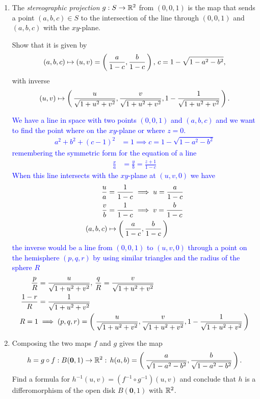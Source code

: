 \documentclass[10pt,a4paper]{report}
\newcommand{\BLUE}[1]{\textcolor{blue}{#1}}
\begin{document}
\begin{enumerate}[label=(\alph*)]
	\item The \textit{stereographic projection} $g: S \to \mathbb{R}^2$ from $(0,0,1)$ is the map that sends a point $(a,b,c) \in S$ to the intersection of the line through $(0,0,1)$ and $(a,b,c)$ with the $xy$-plane.
	
	Show that it is given by 
	\begin{align*}
		(a,b,c)\mapsto (u,v)=\left (\, \frac{a}{1-c},\frac{b}{1-c} \,\right ), \, c=1-\sqrt{1-a^2-b^2},
	\end{align*}with inverse
	\begin{align*}
		(u,v) \mapsto\left (\, \frac{u}{\sqrt{1+u^2+v^2}}, \frac{v}{\sqrt{1+u^2+v^2}}, 1-\frac{1}{\sqrt{1+u^2+v^2}} \,\right ).
	\end{align*}
	
	\BLUE{We have a line in space with two points $(0,0,1)$ and $(a,b,c)$ and we want to find the point where on the $xy$-plane or where $z=0$.  
	\begin{align*}
		a^2+b^2+(c-1)^2 &= 1 \implies c = 1-\sqrt{1-a^2-b^2}
	\end{align*}remembering the symmetric form for the equation of a line
	\begin{align*}
		\frac{x}{a} &= \frac{y}{b} = \frac{z+1}{1-c}
	\end{align*}When this line intersects with the $xy$-plane at $(u,v,0)$ we have
	\begin{align*}
		\frac{u}{a} &= \frac{1}{1-c} \implies u = \frac{a}{1-c} \\
		\frac{v}{b}  &= \frac{1}{1-c} \implies v = \frac{b}{1-c} \\
		(a,b,c) &\mapsto\left (\, \frac{a}{1-c}, \frac{b}{1-c} \,\right )
	\end{align*}the inverse would be a line from $(0,0,1)$ to $(u,v,0)$ through a point on the hemisphere $(p,q,r)$ by using similar triangles and the radius of the sphere $R$
	\begin{align*}
		\frac{p}{R} &= \frac{u}{\sqrt{1+u^2+v^2}}, \, \frac{q}{R} = \frac{v}{\sqrt{1+u^2+v^2}} \\
		\frac{1-r}{R} &= \frac{1}{\sqrt{1+u^2+v^2}} \\
		R = 1 &\implies (p,q,r) = \left (\, \frac{u}{\sqrt{1+u^2+v^2}}, \frac{v}{\sqrt{1+u^2+v^2}}, 1-\frac{1}{\sqrt{1+u^2+v^2}} \,\right )
	\end{align*}
	}
	
	\item Composing the two maps $f$ and $g$ gives the map
	\begin{align*}
		h=g \circ f: B(\textbf{0}, 1) \to \mathbb{R}^2: \, h(a,b) = \left (\, \frac{a}{\sqrt{1-a^2-b^2}}, \frac{b}{\sqrt{1-a^2-b^2}} \,\right ).
	\end{align*}Find a formula for $h^{-1}(u,v)=(f^{-1}\circ g^{-1})(u,v)$ and conclude that $h$ is a differomorphism of the open disk $B(\textbf{0},1)$ with $\mathbb{R}^2$.
	

\end{enumerate}
\end{document}
